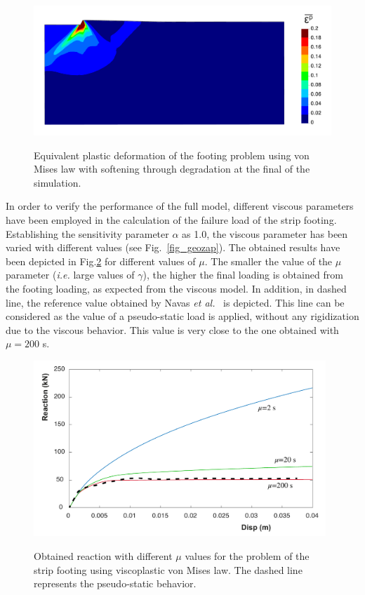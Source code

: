 \documentclass[applsci,journal,article,submit,moreauthors,pdftex]{Definitions/mdpi}
\begin{document}
\begin{figure}[!t]
\begin{center}
\includegraphics[width=12cm]{Figs/shear_band_foot.pdf}\\
\caption{Equivalent plastic deformation of the footing problem using von Mises law with softening through degradation at the final of the simulation.}
\label{fig_soft}
\end{center}
\end{figure}

In order to verify the performance of the full model, different viscous parameters have been employed in the calculation of the failure load of the strip footing. Establishing the sensitivity parameter $\alpha$ as 1.0, the viscous parameter has been varied with different values (see Fig.~\ref{fig_geozap}). The obtained results have been depicted in Fig.\ref{visco} for different values of $\mu$. The smaller the value of the $\mu$ parameter (\textit{i.e.} large values of $\gamma$), the higher the final loading is obtained from the footing loading, as expected from the viscous model. In addition, in dashed line, the reference value obtained by Navas \textit{et al.}~\cite{Navas2018} is depicted. This line can be considered as the value of a pseudo-static load is applied, without any rigidization due to the viscous behavior. This value is very close to the one obtained with $\mu=200$ s. 

\begin{figure}
\begin{center}
\includegraphics[width=11cm]{Figs/visco_d.pdf}\\
\caption{Obtained reaction with different $\mu$ values for the problem of the strip footing using viscoplastic von Mises law. The dashed line represents the pseudo-static behavior.}
\label{visco}
\end{center}
\end{figure}
\end{document}

